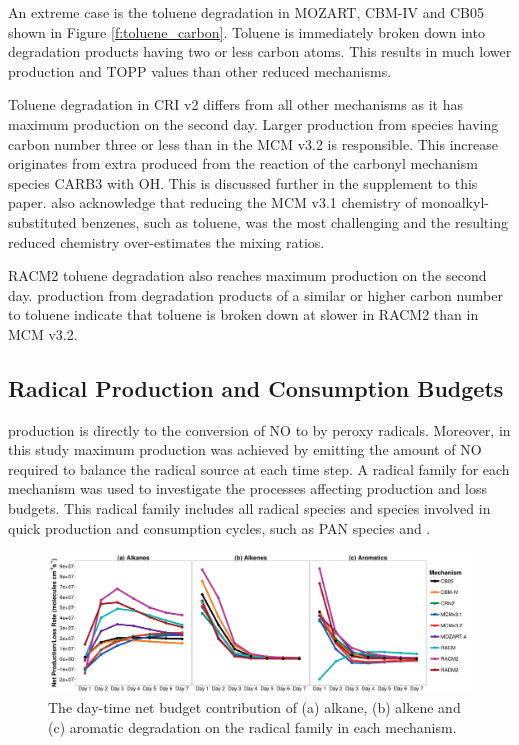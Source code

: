 An extreme case is the toluene degradation in MOZART, CBM-IV and CB05 shown in Figure \ref{f:toluene_carbon}. 
Toluene is immediately broken down into degradation products having two or less carbon atoms. 
This results in much lower  production and TOPP values than other reduced mechanisms. 

Toluene degradation in CRI v2 differs from all other mechanisms as it has maximum  production on the second day. 
Larger  production from species having carbon number three or less than in the MCM v3.2 is responsible. 
This increase originates from extra  produced from the reaction of the carbonyl mechanism species CARB3 with OH. 
This is discussed further in the supplement to this paper. 
\citet{Jenkin:2008} also acknowledge that reducing the MCM v3.1 chemistry of monoalkyl-substituted benzenes, such as toluene, was the most challenging and the resulting reduced chemistry over-estimates the  mixing ratios.

RACM2 toluene degradation also reaches maximum  production on the second day. 
 production from degradation products of a similar or higher carbon number to toluene indicate that toluene is broken down at slower in RACM2 than in MCM v3.2.

\subsection{Radical Production and Consumption Budgets} \label{ss:radicals}

 production is directly to the conversion of NO to  by peroxy radicals. 
Moreover, in this study maximum  production was achieved by emitting the amount of NO required to balance the radical source at each time step. 
A radical family for each mechanism was used to investigate the processes affecting production and loss budgets. 
This radical family includes all radical species and species involved in quick production and consumption cycles, such as PAN species and .

\begin{figure}
    \begin{center}
        \includegraphics[width=\textwidth]{img/Net_radical_budgets}
    \end{center}
    \caption{The day-time net budget contribution of (a) alkane, (b) alkene and (c) aromatic degradation on the radical family in each mechanism.}
    \label{f:net_radical_budgets} 
\end{figure} 

